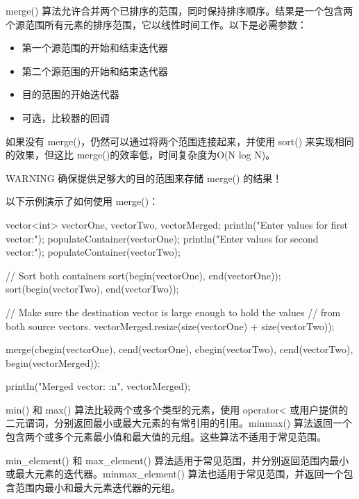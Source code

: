 merge() 算法允许合并两个已排序的范围，同时保持排序顺序。结果是一个包含两个源范围所有元素的排序范围，它以线性时间工作。以下是必需参数：

\begin{itemize}
\item
第一个源范围的开始和结束迭代器

\item
第二个源范围的开始和结束迭代器

\item
目的范围的开始迭代器

\item
可选，比较器的回调
\end{itemize}

如果没有 merge()，仍然可以通过将两个范围连接起来，并使用 sort() 来实现相同的效果，但这比 merge()的效率低，时间复杂度为O(N log N)。

\begin{myWarning}{WARNING}
确保提供足够大的目的范围来存储 merge() 的结果！
\end{myWarning}

以下示例演示了如何使用 merge()：

\begin{cpp}
vector<int> vectorOne, vectorTwo, vectorMerged;
println("Enter values for first vector:");
populateContainer(vectorOne);
println("Enter values for second vector:");
populateContainer(vectorTwo);

// Sort both containers
sort(begin(vectorOne), end(vectorOne));
sort(begin(vectorTwo), end(vectorTwo));

// Make sure the destination vector is large enough to hold the values
// from both source vectors.
vectorMerged.resize(size(vectorOne) + size(vectorTwo));

merge(cbegin(vectorOne), cend(vectorOne),
      cbegin(vectorTwo), cend(vectorTwo), begin(vectorMerged));

println("Merged vector: {:n}", vectorMerged);
\end{cpp}


min() 和 max() 算法比较两个或多个类型的元素，使用 operator< 或用户提供的二元谓词，分别返回最小或最大元素的有常引用的引用。minmax() 算法返回一个包含两个或多个元素最小值和最大值的元组。这些算法不适用于常见范围。

min\_element() 和 max\_element() 算法适用于常见范围，并分别返回范围内最小或最大元素的迭代器。minmax\_element() 算法也适用于常见范围，并返回一个包含范围内最小和最大元素迭代器的元组。

